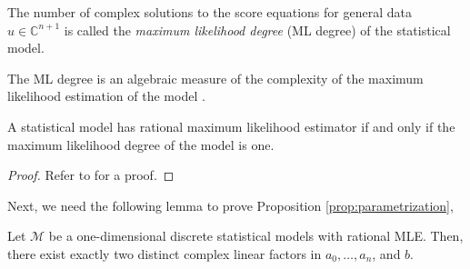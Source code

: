 \begin{definition}
    The number of complex solutions to the score equations for general data \( u \in \mathbb{C}^{n + 1} \) is called the \emph{maximum likelihood degree} (ML degree) of the statistical model. 
\end{definition}


The ML degree is an algebraic measure of the complexity of the maximum likelihood estimation of the model \cite{amendola2019maximum, catanese2006maximum, sullivant2023algebraic}. 

\begin{proposition}\label{prop:rational-mle}
    A statistical model has rational maximum likelihood estimator if and only if the maximum likelihood degree of the model is one.
\end{proposition}

\begin{proof}
   Refer to \cite{duarte2021discrete} for a proof.
\end{proof}

Next, we need the following lemma to prove Proposition \ref{prop:parametrization},

\begin{lemma}\label{lem:two-complex-factors}
    Let \( \mathcal{M} \) be a one-dimensional discrete statistical models with rational MLE. Then, there exist exactly two distinct complex linear factors in \( a_0, \dots, a_n \), and \( b \).
\end{lemma}

